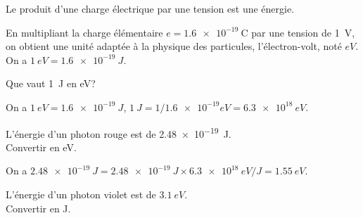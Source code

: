 Le produit d'une charge électrique par une tension est une énergie. 

En multipliant la charge élémentaire $e=\SI{1.6e-19}{\coulomb}$ par une tension de \SI{1}{\volt}, on obtient une unité adaptée à la physique des particules, l'électron-volt, noté $\si{eV}$.
On a $\SI{1}{eV} = \SI{1.6e-19}{J}$. 

\debutEntrainement


\begin{enonce}
Que vaut \SI{1}{J} en \si{eV}?
\end{enonce}


\begin{corrige}
On a $\SI{1}{eV} = \SI{1,6e-19}{J}$, $\SI{1}{J}= 1/\num{1,6e-19} \si{eV} = \SI{6,3e18}{eV}$.
\end{corrige}



\begin{enonce}
L'énergie d'un photon rouge est de \SI{2,48e-19}{J}. \minusMedskip\\ Convertir en \si{eV}.
\end{enonce}


\begin{corrige}
On a $\SI{2,48e-19}{J} = \SI{2,48e-19}{J} \times \SI{6,3e18}{eV/J} = \SI{1,55}{eV}$.
\end{corrige}



\begin{enonce}
L'énergie d'un photon violet est de $\SI{3,1}{eV}$. \minusMedskip\\ Convertir en \si{J}.
\end{enonce}

